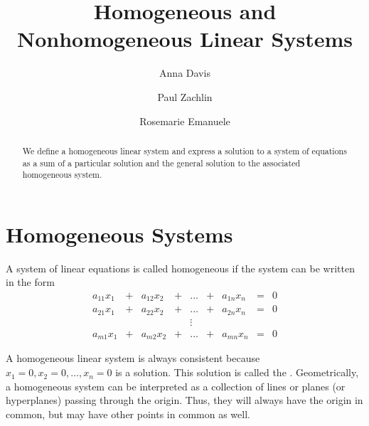 \documentclass{ximera}
\author{Anna Davis \and Paul Zachlin \and Rosemarie Emanuele} \title{Homogeneous and Nonhomogeneous Linear Systems} \license{CC-BY 4.0}
\begin{document}
\begin{abstract}
  We define a homogeneous linear system and express a solution to a system of equations as a sum of a particular solution and the general solution to the associated homogeneous system.
  \end{abstract}
\maketitle

\section*{Homogeneous Systems}

\begin{definition}
A system of linear equations is called homogeneous if the system can be written in the form
$$\begin{array}{ccccccccc}
      a_{11}x_1 &+ &a_{12}x_2&+&\ldots&+&a_{1n}x_n&= &0 \\
	 a_{21}x_1 &+ &a_{22}x_2&+&\ldots&+&a_{2n}x_n&= &0 \\
     &&&&\vdots&&&& \\
     a_{m1}x_1 &+ &a_{m2}x_2&+&\ldots&+&a_{mn}x_n&= &0
    \end{array}$$
\end{definition}

A homogeneous linear system is always consistent because $x_1=0, x_2=0, \ldots ,x_n=0$ is a solution.  This solution is called the .  Geometrically, a homogeneous system can be interpreted as a collection of lines or planes (or hyperplanes) passing through the origin.  Thus, they will always have the origin in common, but may have other points in common as well.
\end{document}
